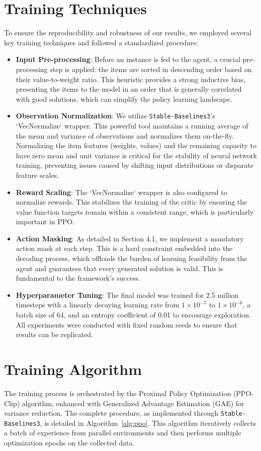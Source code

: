 \section{Training Techniques}
To ensure the reproducibility and robustness of our results, we employed several key training techniques and followed a standardized procedure.
\begin{itemize}
    \item \textbf{Input Pre-processing}: Before an instance is fed to the agent, a crucial pre-processing step is applied: the items are sorted in descending order based on their value-to-weight ratio. This heuristic provides a strong inductive bias, presenting the items to the model in an order that is generally correlated with good solutions, which can simplify the policy learning landscape.
    \item \textbf{Observation Normalization}: We utilize \texttt{Stable-Baselines3}'s `VecNormalize` wrapper. This powerful tool maintains a running average of the mean and variance of observations and normalizes them on-the-fly. Normalizing the item features (weights, values) and the remaining capacity to have zero mean and unit variance is critical for the stability of neural network training, preventing issues caused by shifting input distributions or disparate feature scales.
    \item \textbf{Reward Scaling}: The `VecNormalize` wrapper is also configured to normalize rewards. This stabilizes the training of the critic by ensuring the value function targets remain within a consistent range, which is particularly important in PPO.
    \item \textbf{Action Masking}: As detailed in Section 4.1, we implement a mandatory action mask at each step. This is a hard constraint embedded into the decoding process, which offloads the burden of learning feasibility from the agent and guarantees that every generated solution is valid. This is fundamental to the framework's success.
    \item \textbf{Hyperparameter Tuning}: The final model was trained for 2.5 million timesteps with a linearly decaying learning rate from \(1 \times 10^{-5}\) to \(1 \times 10^{-6}\), a batch size of 64, and an entropy coefficient of 0.01 to encourage exploration. All experiments were conducted with fixed random seeds to ensure that results can be replicated.
\end{itemize}

\section{Training Algorithm}
The training process is orchestrated by the Proximal Policy Optimization (PPO-Clip) algorithm, enhanced with Generalized Advantage Estimation (GAE) for variance reduction. The complete procedure, as implemented through \texttt{Stable-Baselines3}, is detailed in Algorithm~\ref{alg:ppo}. This algorithm iteratively collects a batch of experience from parallel environments and then performs multiple optimization epochs on the collected data.

